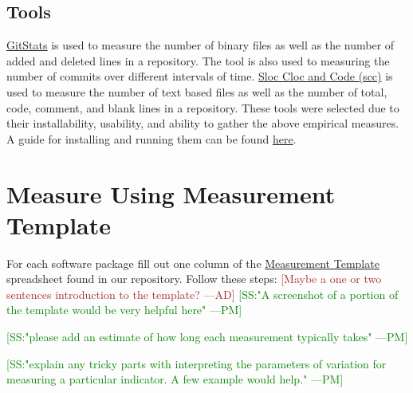 \documentclass[letterpaper,cleveref]{lipics-v2019}
\newcommand{\authornote}[3]{\textcolor{#1}{[#3 ---#2]}}
\newcommand{\authornote}[3]{}
\newcommand{\pmi}[1]{\authornote{green}{PM}{#1}} %
\newcommand{\ad}[1]{\authornote{brown}{AD}{#1}} %
\theoremstyle{definition}
\begin{document}
\subsection{Tools}
\href{https://github.com/tomgi/git_stats}{GitStats} is used to measure the number of binary files as well as the number of added and deleted lines in a repository. The tool is also used to measuring the number of commits over different intervals of time. \href{https://github.com/boyter/scc}{Sloc Cloc and Code (scc)} is used to measure the number of text based files as well as the number of total, code, comment, and blank lines in a repository. These tools were selected due to their installability, usability, and ability to gather the above empirical measures. A guide for installing and running them can be found \href{run:A Guide to Empirical Measures.pdf}{here}.

\section{Measure Using Measurement Template} \label{SecShallowMeasure}
For each software package fill out one column of the \href{run:Combined_MeasurementTemplate_EmpiricalMeasures.xlsx}{Measurement Template} spreadsheet found in our repository. Follow these steps:
\ad{Maybe a one or two sentences introduction to the template?} \pmi{SS:"A screenshot of a portion of the template would be very helpful here"}

\pmi{SS:"please add an estimate of how long each measurement typically takes"}

\pmi{SS:"explain any tricky parts with interpreting the parameters of variation for measuring a particular indicator. A few example would help."}
\end{document}
